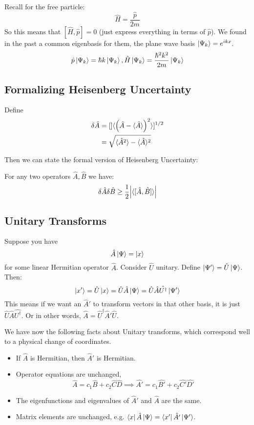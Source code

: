 Recall for the free particle:
\[ \hat{H} = \frac{\hat{p}}{2m} \]
So this means that $[\hat{H}, \hat{p}] = 0$ (just express everything in terms of $\hat{p}$).
We found in the past a common eigenbasis for them, the plane wave basis $\ket{\Psi_k} = e^{ikx}$.
\[ \hat{p} \ket{\Psi_k} = \hbar k \ket{\Psi_k}, \hat{H} \ket{\Psi_k} = \frac{\hbar^2 k^2}{2m} \ket{\Psi_k} \]

\subsection{Formalizing Heisenberg Uncertainty}
Define 
\begin{align*}
    \delta \hat{A} &= \qty[]\langle \qty(\hat{A} - \langle \hat{A} \rangle)^{2} \rangle]^{1/2} \\
    &= \sqrt{\langle \hat{A}^2 \rangle - \langle \hat{A} \rangle^2} 
\end{align*}

Then we can state the formal version of Heisenberg Uncertainty:
\begin{theorem}
    For any two operators $\hat{A}, \hat{B}$ we have:
    \[ \delta \hat{A} \delta \hat{B} \geq \frac{1}{2} \qty|\langle [\hat{A}, \hat{B}] \rangle|\]
\end{theorem}

\subsection{Unitary Transforms}
Suppose you have \[ \hat{A} \ket{\Psi} = \ket{x} \] for some linear Hermitian operator $\hat{A}$.
Consider $\hat{U}$ unitary. Define $\ket{\Psi'} = \hat{U} \ket{\Psi}$. Then:
\[ \ket{x'} = \hat{U} \ket{x} = \hat{U}\hat{A}\ket{\Psi} = \hat{U}\hat{A}\hat{U^{\dagger}}\ket{\Psi'} \]
This means if we want an $\hat{A}'$ to transform vectors in that other basis, it is just $\hat{U}\hat{A}\hat{U^{\dagger}}$.
Or in other words, $\hat{A} = \hat{U}^{\dagger} \hat{A}' \hat{U}$.

We have now the following facts about Unitary transforms, which correspond well to a physical change of coordinates.
\begin{itemize}
    \item If $\hat{A}$ is Hermitian, then $\hat{A}'$ is Hermitian.
    \item Operator equations are unchanged, \[ \hat{A} = c_1 \hat{B} + c_2 \hat{C} \hat{D} \implies \hat{A'} = c_1 \hat{B'} + c_2 \hat{C'} \hat{D'}  \]
    \item The eigenfunctions and eigenvalues of $\hat{A}'$ and $\hat{A}$ are the same.
    \item Matrix elements are unchanged, e.g. $\bra{x}\hat{A}\ket{\Psi} = \bra{x'}\hat{A'}\ket{\Psi'}$.
\end{itemize}

